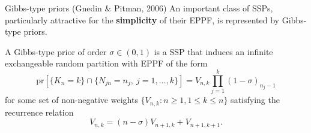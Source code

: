 \documentclass[11pt]{beamer}
\begin{document}
\begin{frame}{Gibbs-type priors (Gnedin \& Pitman, 2006)}
    An important class of SSPs, particularly attractive for the \textbf{simplicity} of their EPPF, is represented by Gibbs-type priors.
    \begin{definition}
        A Gibbs-type prior of order \(\sigma \in (0, 1)\) is a SSP that induces an infinite exchangeable random partition with EPPF of the form
        \begin{equation*}
            \text{pr}[\{K_n = k\} \cap \{N_{jn} = n_j,\ j = 1,...,k\}] = V_{n,k} \prod_{j=1}^k (1 - \sigma)_{n_j - 1}
        \end{equation*}
        for some set of non-negative weights \(\{V_{n, k} \colon n \geq 1, 1 \leq k \leq n\}\) satisfying the recurrence relation
        \begin{equation}
            \label{eq:recurrence}
            V_{n, k} = (n - \sigma) V_{n +1, k} + V_{n + 1, k + 1}.
        \end{equation}
    \end{definition}
\end{frame}
\end{document}
